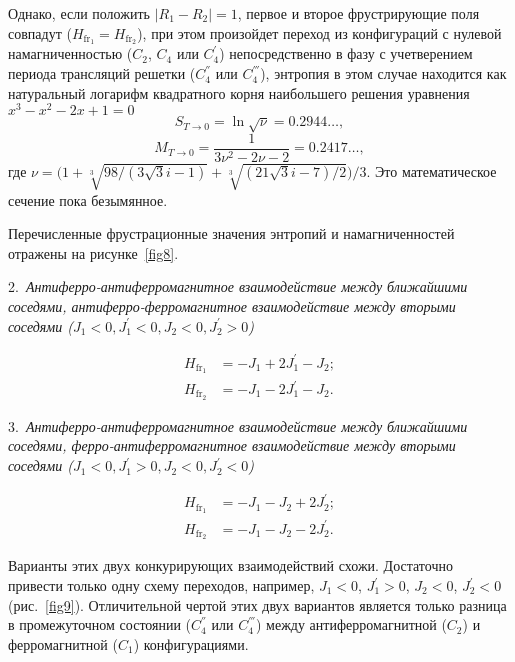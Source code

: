 Однако, если положить $|R_1 - R_2| = 1$, первое и второе фрустрирующие поля совпадут ($H_{\text{fr}_1} = H_{\text{fr}_2}$), при этом произойдет переход из конфигураций с нулевой намагниченностью ($C_2$, $C_4$ или $C_4^{'}$) непосредственно в фазу с учетверением периода трансляций решетки ($C_4^{''}$ или $C_4^{'''}$), энтропия в этом случае находится как натуральный логарифм квадратного корня наибольшего решения уравнения $x^3-x^2-2x+1=0$
\begin{equation}
S_{T\rightarrow 0} = \ln \sqrt{\nu} = 0.2944\dots,
\label{26}
\end{equation}
\begin{equation}
M_{T\rightarrow 0} = \frac{1}{3\nu^2-2\nu-2} = 0.2417\dots,
\label{27}
\end{equation}
где $\nu = \Big(1+\sqrt[3]{98/(3\sqrt{3}i-1)}+\sqrt[3]{(21\sqrt{3}i-7)/2}\Big)/3$. Это математическое сечение пока безымянное.

Перечисленные фрустрационные значения энтропий и намагниченностей отражены на рисунке~\ref{fig8}.


2.~\emph{Антиферро-антиферромагнитное взаимодействие между ближайшими соседями, антиферро-ферромагнитное взаимодействие между вторыми соседями ($J_1<0, J_{1}^{'}<0, J_{2}<0, J_{2}^{'}>0$)}

\[
\begin{aligned}
H_{\text{fr}_1}&=-J_1+2J_{1}^{'}-J_{2};\\
H_{\text{fr}_2}&= -J_1-2J_1^{'}-J_2.
\end{aligned}
\]

3.~\emph{Антиферро-антиферромагнитное взаимодействие между ближайшими соседями, ферро-антиферромагнитное взаимодействие между вторыми соседями ($J_1<0, J_{1}^{'}>0, J_{2}<0, J_{2}^{'}<0$)}

\[
\begin{aligned}
H_{\text{fr}_1}&=-J_1-J_{2}+2J_{2}^{'};\\
H_{\text{fr}_2}&= -J_1-J_2-2J_2^{'}.
\end{aligned}
\]

Варианты этих двух конкурирующих взаимодействий схожи. Достаточно привести только одну схему переходов, например, $J_1 < 0$, $J_1^{'} > 0$, $J_2 < 0$, $J_2^{'} < 0$ (рис.~\ref{fig9}). Отличительной чертой этих двух вариантов является только разница в промежуточном состоянии ($C_4^{''}$ или $C_4^{'''}$) между антиферромагнитной ($C_2$) и ферромагнитной ($C_1$) конфигурациями.

